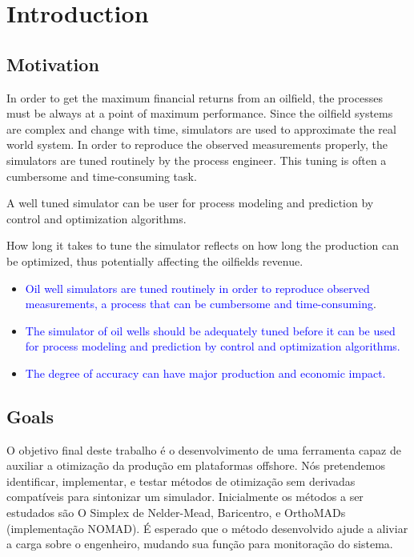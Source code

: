 

\chapter{Introduction} \label{chap:1}



\section{Motivation}

In order to get the maximum financial returns from an oilfield, the processes must be always at a point of maximum performance. Since the oilfield systems are complex and change with time, simulators are used to approximate the real world system. In order to reproduce the observed measurements properly, 
the simulators are tuned routinely by the process engineer. This tuning is often a cumbersome and time-consuming task.

A well tuned simulator can be user for process modeling and prediction by control and optimization algorithms.

How long it takes to tune the simulator reflects on how long the production can be optimized, thus potentially affecting the oilfields revenue.


\begin{itemize}

 \item \textcolor{blue}{Oil well simulators are tuned routinely in order to reproduce observed measurements, a process that can be cumbersome and time-consuming}.
 
 \item \textcolor{blue}{The simulator of oil wells should be adequately tuned before it can be used for process modeling and prediction by control and optimization algorithms.}
 
 \item \textcolor{blue}{The degree of accuracy can have major production and economic impact.}
\end{itemize}


\section{Goals}

O objetivo final deste trabalho é o desenvolvimento de uma ferramenta capaz de auxiliar a otimização da produção em plataformas offshore. Nós pretendemos identificar, implementar, e testar métodos de otimização sem derivadas compatíveis para sintonizar um simulador.
Inicialmente os métodos a ser estudados são O Simplex de Nelder-Mead, Baricentro, e OrthoMADs (implementação NOMAD).
É esperado que o método desenvolvido ajude a aliviar a carga sobre o engenheiro, mudando sua função para monitoração do sistema.

